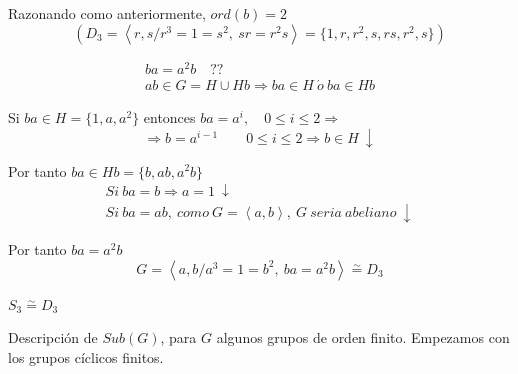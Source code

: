 \documentclass{article}
\begin{document}
\begin{enumerate}[(1)]
Razonando como anteriormente, $ord(b)=2$
\begin{equation*}
(D_3=\left\langle r,s/r^3=1=s^2,\:sr=r^2s\right\rangle=\{1,r,r^2,s,rs,r^2,s\})
\end{equation*}

\begin{gather*}
ba=a^2b \quad ?? \\
ab\in G = H\cup Hb\Rightarrow ba\in H\:\acute{o}\:ba\in Hb
\end{gather*}

Si $ba\in H=\{1,a,a^2\}$ entonces $ba=a^i,\quad 0\leq i\leq 2\Rightarrow$
\begin{equation*}
\Rightarrow b=a^{i-1}\qquad 0\leq i \leq 2 \Rightarrow b\in H \: \downarrow
\end{equation*}

Por tanto $ba\in Hb=\{b,ab,a^2b\}$
\begin{gather*}
Si\:ba=b\Rightarrow a=1\:\downarrow \\
Si\:ba=ab,\:como\:G=\left\langle a,b\right\rangle,\:G\:seria\:abeliano\:\downarrow
\end{gather*}

Por tanto $ba=a^2b$
\begin{equation*}
G=\left\langle a,b/a^3=1=b^2,\:ba=a^2b\right\rangle \overset{\sim}{=}D_3
\end{equation*}

$S_3\overset{\sim}{=}D_3$
\end{enumerate}

Descripción de $Sub(G)$, para $G$ algunos grupos de orden finito. Empezamos con los grupos cíclicos finitos. \\
\end{document}
